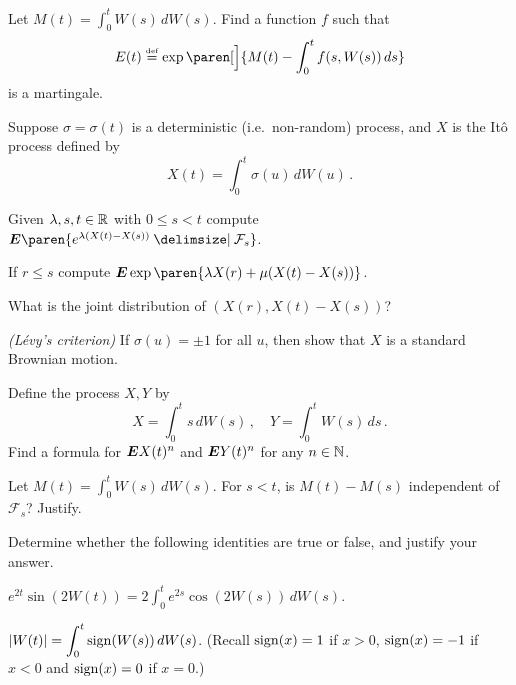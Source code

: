 \begin{problem}
  Let $\displaystyle M(t) = \int_0^t W(s) \, dW(s)$.
  Find a function $f$ such that
  \begin{equation*}
    E(t) \defeq \exp\paren[\Big]{ M(t) - \int_0^t f(s, W(s)) \, ds }
  \end{equation*}
  is a martingale.
\end{problem}
\begin{problem}\label{pr:3levy}
  Suppose $\sigma = \sigma(t)$ is a deterministic (i.e.\ non-random) process, and $X$ is the It\^o process defined by
  \begin{equation*}
    X(t) = \int_0^t \sigma(u) \, dW(u)\,.
  \end{equation*}
  \vspace{-.7\baselineskip}
  \begin{parts}
    \item
      Given $\lambda, s, t \in \mathbb{R}$ with $0 \leq s < t$ compute $\E \paren{ e^{\lambda (X(t) - X(s))} \given \mathcal F_s}$.

    \item
      If $r \leq s$ compute $\E \exp\paren{\lambda X(r) + \mu(X(t) - X(s))}$.

    \item
      What is the joint distribution of $(X(r), X(t) - X(s))$?

    \item
      \emph{(L\'evy's criterion)}
      If $\sigma(u) = \pm 1$ for all $u$, then show that $X$ is a standard Brownian motion.
  \end{parts}
\end{problem}
\begin{problem}
  Define the process $X, Y$ by
  \begin{equation*}
    X = \int_0^t s \, dW(s)\,,
    \quad
    Y = \int_0^t W(s) \, ds\,.
  \end{equation*}
  Find a formula for $\bm{E} X(t)^n$ and $\bm{E} Y(t)^n$ for any $n \in \mathbb{N}$.
\end{problem}
\begin{problem}
  Let $\displaystyle M(t) = \int_0^t W(s) \, dW(s)$.
  For $s < t$, is $M(t) - M(s)$ independent of $\mathcal F_s$?
  Justify.
\end{problem}

\begin{problem}
  Determine whether the following identities are true or false, and justify your answer.
  \begin{parts}
    \item
      $\displaystyle e^{2t} \sin(2 W(t)) = 2 \int_0^t e^{2s} \cos(2 W(s)) \, dW(s)$.

    \item
      $\displaystyle \lvert W(t)\rvert = \int_0^t \operatorname{sign}(W(s)) \, dW(s)$.
      (Recall $\operatorname{sign}(x) = 1$ if $x > 0$, $\operatorname{sign}(x) = -1$ if $x < 0$ and $\operatorname{sign}(x) = 0$ if $x = 0$.)
  \end{parts}
\end{problem}
